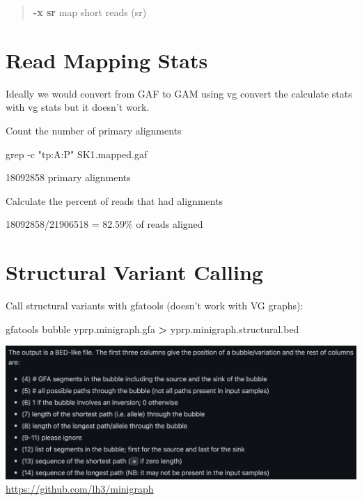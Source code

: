 \documentclass[
]{book}
\newenvironment{Shaded}{\begin{snugshade}}{\end{snugshade}}
\newcommand{\AttributeTok}[1]{\textcolor[rgb]{0.77,0.63,0.00}{#1}}
\newcommand{\ExtensionTok}[1]{#1}
\newcommand{\FunctionTok}[1]{\textcolor[rgb]{0.00,0.00,0.00}{#1}}
\newcommand{\NormalTok}[1]{#1}
\newcommand{\OperatorTok}[1]{\textcolor[rgb]{0.81,0.36,0.00}{\textbf{#1}}}
\newcommand{\StringTok}[1]{\textcolor[rgb]{0.31,0.60,0.02}{#1}}
\begin{document}
\begin{quote}
\textbf{-x sr} map short reads (sr)
\end{quote}

\hypertarget{read-mapping-stats}{%
\section{Read Mapping Stats}\label{read-mapping-stats}}

Ideally we would convert from GAF to GAM using vg convert the calculate stats with vg stats but it doesn't work.

Count the number of primary alignments

\begin{Shaded}
\begin{Highlighting}[]
\FunctionTok{grep} \AttributeTok{{-}c} \StringTok{"tp:A:P"}\NormalTok{ SK1.mapped.gaf}
\end{Highlighting}
\end{Shaded}

18092858 primary alignments

Calculate the percent of reads that had alignments

18092858/21906518 = 82.59\% of reads aligned

\hypertarget{structural-variant-calling}{%
\section{Structural Variant Calling}\label{structural-variant-calling}}

Call structural variants with gfatools (doesn't work with VG graphs):

\begin{Shaded}
\begin{Highlighting}[]
\ExtensionTok{gfatools}\NormalTok{ bubble yprp.minigraph.gfa }\OperatorTok{\textgreater{}}\NormalTok{ yprp.minigraph.structural.bed}
\end{Highlighting}
\end{Shaded}

\includegraphics[width=1\textwidth,height=\textheight]{./Figures/BED.png}
\url{https://github.com/lh3/minigraph}
\end{document}
